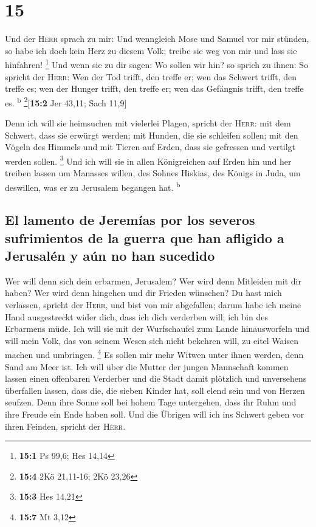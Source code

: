 \hypertarget{section-14}{%
\section{15}\label{section-14}}

 Und der \textsc{Herr} sprach zu mir: Und wenngleich Mose
und Samuel vor mir stünden, so habe ich doch kein Herz zu diesem Volk;
treibe sie weg von mir und lass sie hinfahren! \footnote{\textbf{15:1}
  Ps 99,6; Hes 14,14}  Und wenn sie zu dir sagen: Wo
sollen wir hin? so sprich zu ihnen: So spricht der \textsc{Herr}: Wen
der Tod trifft, den treffe er; wen das Schwert trifft, den treffe es;
wen der Hunger trifft, den treffe er; wen das Gefängnis trifft, den
treffe es. \textsuperscript{b} \footnote{\textbf{15:4} 2Kö 21,11-16; 2Kö
  23,26}{[}\textbf{15:2} Jer 43,11; Sach 11,9{]}

 Denn ich will sie heimsuchen mit vielerlei Plagen,
spricht der \textsc{Herr}: mit dem Schwert, dass sie erwürgt werden; mit
Hunden, die sie schleifen sollen; mit den Vögeln des Himmels und mit
Tieren auf Erden, dass sie gefressen und vertilgt werden sollen.
\footnote{\textbf{15:3} Hes 14,21}  Und ich will sie in
allen Königreichen auf Erden hin und her treiben lassen um Manasses
willen, des Sohnes Hiskias, des Königs in Juda, um deswillen, was er zu
Jerusalem begangen hat. \textsuperscript{b}

\hypertarget{el-lamento-de-jeremuxedas-por-los-severos-sufrimientos-de-la-guerra-que-han-afligido-a-jerusaluxe9n-y-auxfan-no-han-sucedido}{%
\subsection{El lamento de Jeremías por los severos sufrimientos de la
guerra que han afligido a Jerusalén y aún no han
sucedido}\label{el-lamento-de-jeremuxedas-por-los-severos-sufrimientos-de-la-guerra-que-han-afligido-a-jerusaluxe9n-y-auxfan-no-han-sucedido}}

 Wer will denn sich dein erbarmen, Jerusalem? Wer wird
denn Mitleiden mit dir haben? Wer wird denn hingehen und dir Frieden
wünschen?  Du hast mich verlassen, spricht der
\textsc{Herr}, und bist von mir abgefallen; darum habe ich meine Hand
ausgestreckt wider dich, dass ich dich verderben will; ich bin des
Erbarmens müde.  Ich will sie mit der Wurfschaufel zum
Lande hinausworfeln und will mein Volk, das von seinem Wesen sich nicht
bekehren will, zu eitel Waisen machen und umbringen. \footnote{\textbf{15:7}
  Mt 3,12}  Es sollen mir mehr Witwen unter ihnen werden,
denn Sand am Meer ist. Ich will über die Mutter der jungen Mannschaft
kommen lassen einen offenbaren Verderber und die Stadt damit plötzlich
und unversehens überfallen lassen,  dass die, die sieben
Kinder hat, soll elend sein und von Herzen seufzen. Denn ihre Sonne soll
bei hohem Tage untergehen, dass ihr Ruhm und ihre Freude ein Ende haben
soll. Und die Übrigen will ich ins Schwert geben vor ihren Feinden,
spricht der \textsc{Herr}.

